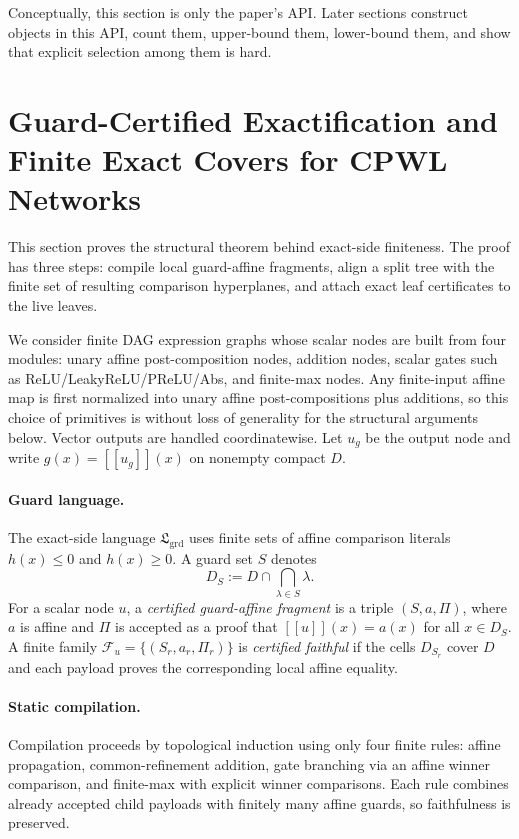 \documentclass{article}
\begin{document}
Conceptually, this section is only the paper's API. Later sections construct objects in this API, count them, upper-bound them, lower-bound them, and show that explicit selection among them is hard.

\section{Guard-Certified Exactification and Finite Exact Covers for CPWL Networks}\label{sec:guard-exactification}

This section proves the structural theorem behind exact-side finiteness. The proof has three steps: compile local guard-affine fragments, align a split tree with the finite set of resulting comparison hyperplanes, and attach exact leaf certificates to the live leaves.

We consider finite DAG expression graphs whose scalar nodes are built from four modules: unary affine post-composition nodes, addition nodes, scalar gates such as ReLU/LeakyReLU/PReLU/Abs, and finite-max nodes. Any finite-input affine map is first normalized into unary affine post-compositions plus additions, so this choice of primitives is without loss of generality for the structural arguments below. Vector outputs are handled coordinatewise. Let $u_g$ be the output node and write $g(x)=[\![u_g]\!](x)$ on nonempty compact $D$.

\paragraph{Guard language.}
The exact-side language $\mathfrak L_{\mathrm{grd}}$ uses finite sets of affine comparison literals $h(x)\le 0$ and $h(x)\ge 0$. A guard set $S$ denotes
\[
D_S:=D\cap \bigcap_{\lambda\in S}\lambda.
\]
For a scalar node $u$, a \emph{certified guard-affine fragment} is a triple $(S,a,\Pi)$, where $a$ is affine and $\Pi$ is accepted as a proof that $[\![u]\!](x)=a(x)$ for all $x\in D_S$. A finite family $\mathcal F_u=\{(S_r,a_r,\Pi_r)\}$ is \emph{certified faithful} if the cells $D_{S_r}$ cover $D$ and each payload proves the corresponding local affine equality.

\paragraph{Static compilation.}
Compilation proceeds by topological induction using only four finite rules: affine propagation, common-refinement addition, gate branching via an affine winner comparison, and finite-max with explicit winner comparisons. Each rule combines already accepted child payloads with finitely many affine guards, so faithfulness is preserved.
\end{document}
